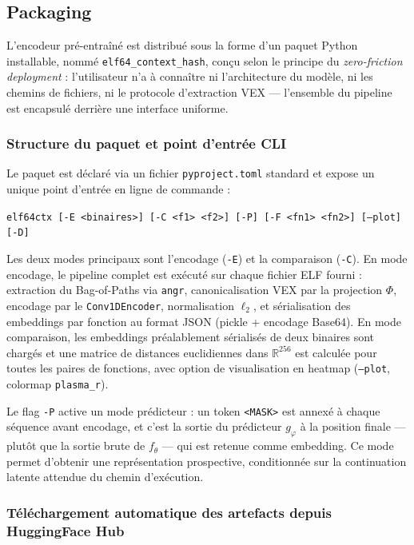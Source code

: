 \subsection{Packaging}\label{sub:Packaging} %

L'encodeur pré-entraîné est distribué sous la forme d'un paquet Python installable,
nommé \texttt{elf64\_context\_hash}, conçu selon le principe du \textit{zero-friction
deployment} : l'utilisateur n'a à connaître ni l'architecture du modèle, ni les chemins
de fichiers, ni le protocole d'extraction VEX — l'ensemble du pipeline est encapsulé
derrière une interface uniforme.

\subsubsection{Structure du paquet et point d'entrée CLI}

Le paquet est déclaré via un fichier \texttt{pyproject.toml} standard et expose un
unique point d'entrée en ligne de commande :

\texttt{elf64ctx [-E <binaires>] [-C <f1> <f2>] [-P] [-F <fn1> <fn2>] [--plot] [-D]}

Les deux modes principaux sont l'encodage (\texttt{-E}) et la comparaison
(\texttt{-C}). En mode encodage, le pipeline complet est exécuté sur chaque fichier ELF
fourni : extraction du Bag-of-Paths via \texttt{angr}, canonicalisation VEX par la
projection $\Phi$, encodage par le \texttt{Conv1DEncoder}, normalisation $\ell_2$, et
sérialisation des embeddings par fonction au format JSON (pickle + encodage Base64). En
mode comparaison, les embeddings préalablement sérialisés de deux binaires sont chargés
et une matrice de distances euclidiennes dans $\mathbb{R}^{256}$ est calculée pour toutes
les paires de fonctions, avec option de visualisation en heatmap (\texttt{--plot},
colormap \texttt{plasma\_r}).

Le flag \texttt{-P} active un mode prédicteur : un token \texttt{<MASK>} est annexé à
chaque séquence avant encodage, et c'est la sortie du prédicteur $g_\varphi$ à la
position finale — plutôt que la sortie brute de $f_\theta$ — qui est retenue comme
embedding. Ce mode permet d'obtenir une représentation prospective, conditionnée sur la
continuation latente attendue du chemin d'exécution.

\subsubsection{Téléchargement automatique des artefacts depuis HuggingFace Hub}


